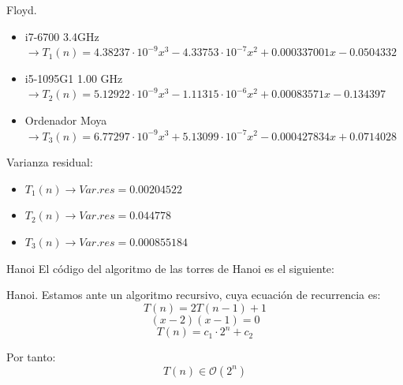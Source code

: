 \documentclass[10pt, xcolor=table]{beamer}
\begin{document}
\begin{frame}{Floyd.
}
\begin{itemize}
	\item i7-6700 3.4GHz \(\rightarrow T_1(n) = 4.38237 \cdot 10^{-9} x^3 - 4.33753 \cdot 10^{-7} x^2 + 0.000337001x - 0.0504332\)
	\item i5-1095G1 1.00 GHz \(\rightarrow T_2(n) = 5.12922 \cdot 10^{-9} x^3 - 1.11315 \cdot 10^{-6} x^2 + 0.00083571x - 0.134397\)
	\item Ordenador Moya \(\rightarrow T_3(n) = 6.77297 \cdot 10^{-9} x^3 + 5.13099 \cdot 10^{-7} x^2 - 0.000427834 x + 0.0714028\)
\end{itemize}

Varianza residual:
\begin{itemize}
	\item \(T_1 (n) \longrightarrow Var.res = 0.00204522\)
	\item \(T_2 (n) \longrightarrow Var.res = 0.044778\)
	\item \(T_3 (n) \longrightarrow Var.res = 0.000855184\)
\end{itemize}
\end{frame}

\begin{frame}{Hanoi}
El código del algoritmo de las torres de Hanoi es el siguiente:

\end{frame}

\begin{frame}[fragile]{Hanoi.
}
Estamos ante un algoritmo recursivo, cuya ecuación de recurrencia es:
\[
	T(n) = 2 T(n-1) +1
\]
\[
	(x-2)(x-1) = 0
\]
\[
	T(n) = c_1 \cdot 2^n + c_2
\]

Por tanto:
\[
	T(n) \in \mathcal{O}(2^n)
\]
\end{frame}
\end{document}
